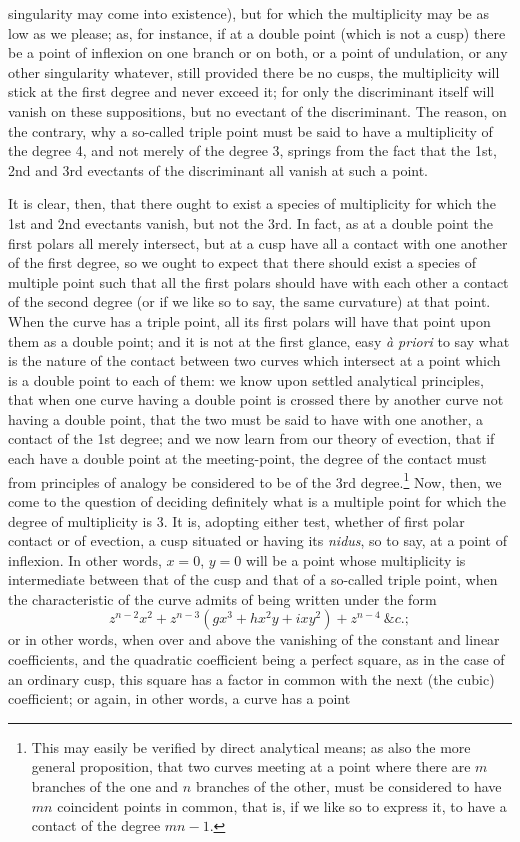 \documentclass[11pt]{article}
\newcommand{\sourcepage}[1]{\marginpar{\scriptsize p.~#1}}
\begin{document}
\sourcepage{372}
singularity may come into existence), but for which the multiplicity may be as low as we please; as, for instance, if at a double point (which is not a cusp) there be a point of inflexion on one branch or on both, or a point of undulation, or any other singularity whatever, still provided there be no cusps, the multiplicity will stick at the first degree and never exceed it; for only the discriminant itself will vanish on these suppositions, but no evectant of the discriminant. The reason, on the contrary, why a so-called triple point must be said to have a multiplicity of the degree 4, and not merely of the degree 3, springs from the fact that the 1st, 2nd and 3rd evectants of the discriminant all vanish at such a point.

It is clear, then, that there ought to exist a species of multiplicity for which the 1st and 2nd evectants vanish, but not the 3rd. In fact, as at a double point the first polars all merely intersect, but at a cusp have all a contact with one another of the first degree, so we ought to expect that there should exist a species of multiple point such that all the first polars should have with each other a contact of the second degree (or if we like so to say, the same curvature) at that point. When the curve has a triple point, all its first polars will have that point upon them as a double point; and it is not at the first glance, easy \emph{à priori} to say what is the nature of the contact between two curves which intersect at a point which is a double point to each of them: we know upon settled analytical principles, that when one curve having a double point is crossed there by another curve not having a double point, that the two must be said to have with one another, a contact of the 1st degree; and we now learn from our theory of evection, that if each have a double point at the meeting-point, the degree of the contact must from principles of analogy be considered to be of the 3rd degree.\footnote{This may easily be verified by direct analytical means; as also the more general proposition, that two curves meeting at a point where there are $m$ branches of the one and $n$ branches of the other, must be considered to have $mn$ coincident points in common, that is, if we like so to express it, to have a contact of the degree $mn-1$.} Now, then, we come to the question of deciding definitely what is a multiple point for which the degree of multiplicity is 3. It is, adopting either test, whether of first polar contact or of evection, a cusp situated or having its \emph{nidus}, so to say, at a point of inflexion. In other words, $x=0$, $y=0$ will be a point whose multiplicity is intermediate between that of the cusp and that of a so-called triple point, when the characteristic of the curve admits of being written under the form
\[
z^{n-2}x^2+z^{n-3}(gx^3+hx^2y+ixy^2)+z^{n-4}\ \&c.;
\]
or in other words, when over and above the vanishing of the constant and linear coefficients, and the quadratic coefficient being a perfect square, as in the case of an ordinary cusp, this square has a factor in common with the next (the cubic) coefficient; or again, in other words, a curve has a point
\end{document}
